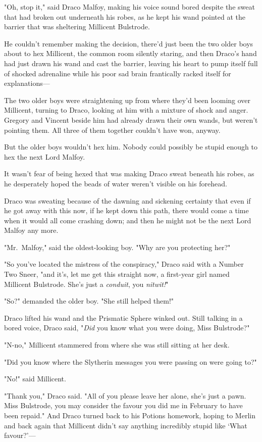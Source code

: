 "Oh, stop it," said Draco Malfoy, making his voice sound bored despite the
sweat that had broken out underneath his robes, as he kept his wand pointed at
the barrier that was sheltering Millicent Bulstrode.

He couldn't remember making the decision, there'd just been the two older boys
about to hex Millicent, the common room silently staring, and then Draco's hand
had just drawn his wand and cast the barrier, leaving his heart to pump itself
full of shocked adrenaline while his poor sad brain frantically racked itself
for explanations---

The two older boys were straightening up from where they'd been looming over
Millicent, turning to Draco, looking at him with a mixture of shock and anger.
Gregory and Vincent beside him had already drawn their own wands, but weren't
pointing them. All three of them together couldn't have won, anyway.

But the older boys wouldn't hex him. Nobody could possibly be stupid enough to
hex the next Lord Malfoy.

It wasn't fear of being hexed that was making Draco sweat beneath his robes, as
he desperately hoped the beads of water weren't visible on his forehead.

Draco was sweating because of the dawning and sickening certainty that even if
he got away with this now, if he kept down this path, there would come a time
when it would all come crashing down; and then he might not be the next Lord
Malfoy any more.

"Mr.~Malfoy," said the oldest-looking boy. "Why are you protecting her?"

"So you've located the mistress of the conspiracy," Draco said with a Number
Two Sneer, "and it's, let me get this straight now, a first-year girl named
Millicent Bulstrode. She's just a \emph{conduit}, you \emph{nitwit!}"

"So?" demanded the older boy. "She still helped them!"

Draco lifted his wand and the Prismatic Sphere winked out. Still talking in a
bored voice, Draco said, "\emph{Did} you know what you were doing, Miss
Bulstrode?"

"N-no," Millicent stammered from where she was still sitting at her desk.

"Did you know where the Slytherin messages you were passing on were going to?"

"No!" said Millicent.

"Thank you," Draco said. "All of you please leave her alone, she's just a pawn.
Miss Bulstrode, you may consider the favour you did me in February to have been
repaid." And Draco turned back to his Potions homework, hoping to Merlin and
back again that Millicent didn't say anything incredibly stupid like `What
favour?'---


